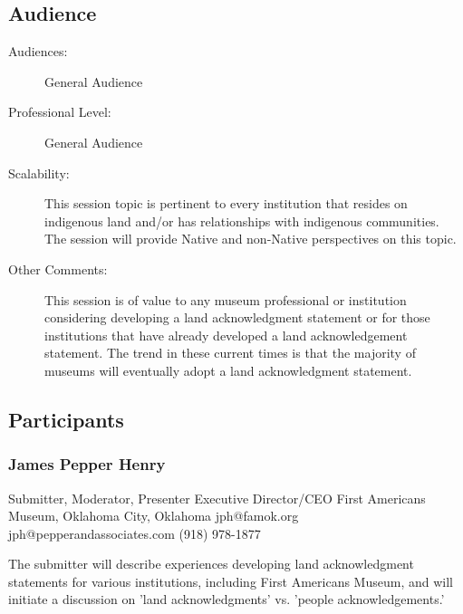 \documentclass{report}
\begin{document}
              \subsection*{Audience}
                \begin{description}
                  \item [Audiences:]General Audience~
                  \item[Professional Level:]General Audience~
                \item[Scalability:] This session topic is pertinent to every institution that resides on indigenous land and/or has relationships with indigenous communities. The session will provide Native and non-Native perspectives on this topic.

							
              \item[Other Comments:] This session is of value to any museum professional or institution considering developing a land acknowledgment statement or for those institutions that have already developed a land acknowledgement statement.  The trend in these current times is that the majority of museums will eventually adopt a land acknowledgment statement.
              \end{description}
            \subsection*{Participants}
              \subsubsection*{ James Pepper Henry }
              Submitter, Moderator, Presenter\newline
              Executive Director/CEO\newline
              First Americans Museum, Oklahoma City, Oklahoma
              \newline
              jph@famok.org\newline
              jph@pepperandassociates.com\newline
              (918) 978-1877\newline

              The submitter will describe experiences developing land acknowledgment statements for various institutions, including First Americans Museum, and will initiate a discussion on 'land acknowledgments' vs. 'people acknowledgements.'\newline
\end{document}

